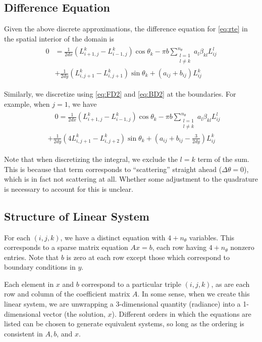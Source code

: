 \documentclass[10pt]{article}
\begin{document}
\begin{multicols}{2}
\subsection{Difference Equation}
Given the above discrete approximations, the difference equation for \eqref{eq:rte} in the spatial interior of the domain is
\begin{align}
    \label{eq:diffeq}
    \begin{split}
    0 &= \frac{1}{2dx}\left(L_{i+1,j}^k - L_{i-1,j}^k\right) \cos\theta_k
    - \pi b \sum_{\substack{l=1\\ l\neq k}}^{n_\theta} a_l\beta_{kl}L_{ij}^l \\
    &+ \frac{1}{2dy}\left(L_{i,j+1}^k - L_{i,j+1}^k\right) \sin\theta_k
    + (a_{ij} + b_{ij})L_{ij}^k
    \end{split}
\end{align}

Similarly, we discretize using \eqref{eq:FD2} and \eqref{eq:BD2} at the boundaries.
For example, when $j=1$, we have
\begin{align}
    \label{eq:diffeq_bc}
    \begin{split}
    &\quad0 = \frac{1}{2dx}\left(L_{i+1,j}^k - L_{i-1,j}^k\right) \cos\theta_k
    - \pi b \sum_{\substack{l=1\\ l\neq k}}^{n_\theta} a_l\beta_{kl}L_{ij}^l \\
	&+ \frac{1}{2dy}\left(4L_{i,j+1}^k - L_{i,j+2}^k\right) \sin\theta_k
	+ (a_{ij} + b_{ij} -\frac{3}{2dy})L_{ij}^k
    \end{split}
\end{align}

Note that when discretizing the integral, we exclude the $l=k$ term of the sum.
This is because that term corresponds to ``scattering'' straight ahead ($\Delta\theta=0$), which is in fact not scattering at all.
Whether some adjustment to the quadrature is necessary to account for this is unclear.

\subsection{Structure of Linear System}
For each $(i,j,k)$, we have a distinct equation with $4+n_\theta$ variables.
This corresponds to a sparse matrix equation $Ax=b$, each row having $4+n_\theta$ nonzero entries.
Note that $b$ is zero at each row except those which correspond to boundary conditions in $y$.

Each element in $x$ and $b$ correspond to a particular triple $(i,j,k)$, as are each row and column of the coefficient matrix $A$.
In some sense, when we create this linear system, we are unwrapping a 3-dimensional quantity (radiance) into a 1-dimensional vector (the solution, $x$).
Different orders in which the equations are listed can be chosen to generate equivalent systems, so long as the ordering is consistent in $A,b$, and $x$.


\end{multicols}
\end{document}
